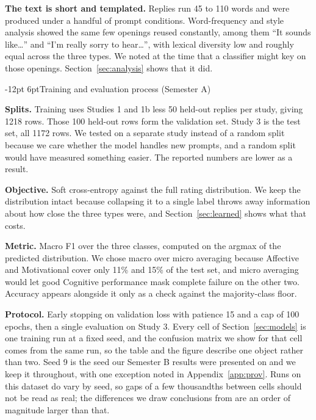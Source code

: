 \documentclass[11pt,a4paper]{article}
\makeatletter
\renewcommand\section{\@startsection{section}{1}{\z@}%
  {-12pt \@plus -3pt \@minus -2pt}{6pt}{\normalfont\large\bfseries}}
\makeatother
\begin{document}
\textbf{The text is short and templated.} Replies run 45 to 110 words and were produced
under a handful of prompt conditions. Word-frequency and style analysis showed the same
few openings reused constantly, among them ``It sounds like\ldots'' and ``I'm really sorry
to hear\ldots'', with lexical diversity low and roughly equal across the three types. We
noted at the time that a classifier might key on those openings. Section~\ref{sec:analysis}
shows that it did.

\section{Training and evaluation process (Semester A)}
\label{sec:train}

\textbf{Splits.} Training uses Studies 1 and 1b less 50 held-out replies per study, giving
1218 rows. Those 100 held-out rows form the validation set. Study 3 is the test set, all
1172 rows. We tested on a separate study instead of a random split because we care whether
the model handles new prompts, and a random split would have measured something easier.
The reported numbers are lower as a result.

\textbf{Objective.} Soft cross-entropy against the full rating distribution. We keep the
distribution intact because collapsing it to a single label throws away information about
how close the three types were, and Section~\ref{sec:learned} shows what that costs.

\textbf{Metric.} Macro F1 over the three classes, computed on the argmax of the predicted
distribution. We chose macro over micro averaging because Affective and Motivational cover
only 11\% and 15\% of the test set, and micro averaging would let good Cognitive
performance mask complete failure on the other two. Accuracy appears alongside it only as
a check against the majority-class floor.

\textbf{Protocol.} Early stopping on validation loss with patience 15 and a cap of 100
epochs, then a single evaluation on Study 3. Every
cell of Section~\ref{sec:models} is one training run at a fixed seed, and the confusion
matrix we show for that cell comes from the same run, so the table and the figure describe
one object rather than two. Seed 9 is the seed our Semester B results were presented on and
we keep it throughout, with one exception noted in Appendix~\ref{app:prov}. Runs on this
dataset do vary by seed, so gaps of a few thousandths between cells should not be read as
real; the differences we draw conclusions from are an order of magnitude larger than that.
\end{document}
